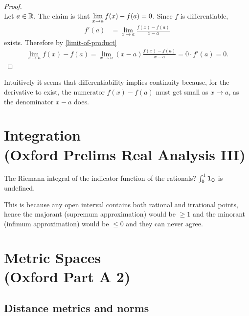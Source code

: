 \begin{proof}~\\
  Let $a \in \mathbb{R}$. The claim is that $\limxa f(x) - f(a) = 0$. Since $f$ is differentiable,
  \begin{align*}
    f'(a) &= \lim_{x \to a} \frac{f(x) - f(a)}{x - a}
  \end{align*}
  exists. Therefore by \eqref{limit-of-product}
  \begin{align*}
    \lim_{x \to a} f(x) - f(a) = \lim_{x \to a} (x - a)\frac{f(x) - f(a)}{x - a} = 0\cdot f'(a) = 0.
  \end{align*}
\end{proof}

\begin{remark*}
  Intuitively it seems that differentiability implies continuity because, for the derivative to
  exist, the numerator $f(x) - f(a)$ must get small as $x\to a$, as the denominator $x - a$ does.
\end{remark*}


\newpage
\section{Integration\\(Oxford Prelims Real Analysis III)}

The Riemann integral of the indicator function of the rationals? $\int_0^1 {\bf 1}_{\mathbb{Q}}$ is undefined.

This is because any open interval contains both rational and irrational points, hence the majorant (supremum
approximation) would be $\geq 1$ and the minorant (infimum approximation) would be $\leq 0$ and they can never
agree.






\section{Metric Spaces\\(Oxford Part A 2)}


\subsection{Distance metrics and norms}

